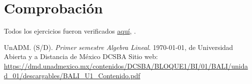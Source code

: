 \documentclass[12pt]{article}
\begin{document}
\section*{Comprobaci\'on}
	\par Todos los ejercicios fueron verificados \href{https://github.com/BenchHPZ/UnADM-Biotecnologia/blob/master/B1-1/BALI/Actividades/BALI_U2_A2_BERC.ipynb}{aqu\'i}, .



\newpage
\begin{thebibliography}{X}
	 UnADM. (S/D). \emph{Primer semestre Algebra Lineal}. \today, de Universidad Abierta y a Distancia de México \textbar{} DCSBA
Sitio web:
\url{https://dmd.unadmexico.mx/contenidos/DCSBA/BLOQUE1/BI/01/BALI/unidad_01/descargables/BALI_U1_Contenido.pdf}
\end{thebibliography}
\end{document}

